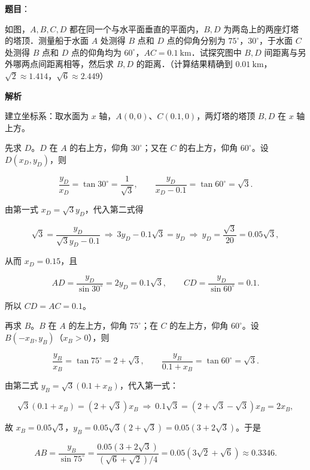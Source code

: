 \begin{answer}

\textbf{题目}：

如图，$A,B,C,D$ 都在同一个与水平面垂直的平面内，$B,D$ 为两岛上的两座灯塔的塔顶．测量船于水面 $A$ 处测得 $B$ 点和 $D$ 点的仰角分别为 $75^\circ$，$30^\circ$，于水面 $C$ 处测得 $B$ 点和 $D$ 点的仰角均为 $60^\circ$，$AC=0.1\ \mathrm{km}$．试探究图中 $B,D$ 间距离与另外哪两点间距离相等，然后求 $B,D$ 的距离．（计算结果精确到 $0.01\ \mathrm{km}$，$\sqrt2\approx1.414$，$\sqrt6\approx2.449$）
\nopagebreak[4]
\begin{center}\end{center}
\nopagebreak[4]
\textbf{解析}

建立坐标系：取水面为 $x$ 轴，$A(0,0)$、$C(0.1,0)$，两灯塔的塔顶 $B,D$ 在 $x$ 轴上方。

先求 $D$。$D$ 在 $A$ 的右上方，仰角 $30^\circ$；又在 $C$ 的右上方，仰角 $60^\circ$。设 $D(x_D,y_D)$，则

\nopagebreak[4]
\[\frac{y_D}{x_D}=\tan30^\circ=\frac1{\sqrt3},\qquad
\frac{y_D}{x_D-0.1}=\tan60^\circ=\sqrt3 .\]

由第一式 $x_D=\sqrt3 y_D$，代入第二式得

\nopagebreak[4]
\[\sqrt3=\frac{y_D}{\sqrt3 y_D-0.1}
\ \Longrightarrow\ 3y_D-0.1\sqrt3=y_D
\ \Longrightarrow\ y_D=\frac{\sqrt3}{20}=0.05\sqrt3,\]

从而 $x_D=0.15$，且

\nopagebreak[4]
\[AD=\frac{y_D}{\sin30^\circ}=2y_D=0.1\sqrt3,\qquad
CD=\frac{y_D}{\sin60^\circ}=0.1 .\]

所以 $CD=AC=0.1$。

再求 $B$。$B$ 在 $A$ 的左上方，仰角 $75^\circ$；在 $C$ 的左上方，仰角 $60^\circ$。设 $B(-x_B,y_B)$（$x_B>0$），则

\nopagebreak[4]
\[\frac{y_B}{x_B}=\tan75^\circ=2+\sqrt3,\qquad
\frac{y_B}{0.1+x_B}=\tan60^\circ=\sqrt3 .\]

由第二式 $y_B=\sqrt3(0.1+x_B)$，代入第一式：

\nopagebreak[4]
\[\sqrt3(0.1+x_B)=(2+\sqrt3)x_B
\ \Longrightarrow\ 0.1\sqrt3=(2+\sqrt3-\sqrt3)x_B=2x_B,\]

故 $x_B=0.05\sqrt3$，$y_B=0.05\sqrt3(2+\sqrt3)=0.05(3+2\sqrt3)$。于是

\nopagebreak[4]
\[AB=\frac{y_B}{\sin75^\circ}
=\frac{0.05(3+2\sqrt3)}{(\sqrt6+\sqrt2)/4}
=0.05(3\sqrt2+\sqrt6)
\approx0.3346 .\]


\end{answer}
